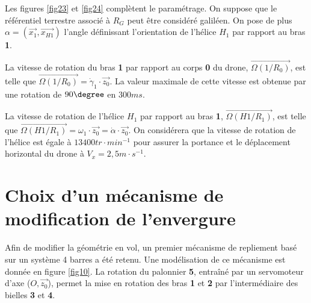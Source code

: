 Les figures \ref{fig23} et \ref{fig24} complètent le paramétrage. On suppose que le référentiel terrestre associé à $R_G$ peut être considéré galiléen. On pose de plus $\alpha=(\vec{x_1},\vec{x_{H1}})$ l'angle définissant l'orientation de l'hélice \textbf{$H_1$} par rapport au bras \textbf{1}.

La vitesse de rotation du bras \textbf{1} par rapport au corps \textbf{0} du drone, $\overrightarrow{\Omega(1/R_0)}$, est telle que $\overrightarrow{\Omega(1/R_0)}=\dot{\gamma}_1\cdot\vec{z_0}$. La valeur maximale de cette vitesse est obtenue par une rotation de $90\degree$ en
$300ms$.

La vitesse de rotation de l'hélice \textbf{$H_1$} par rapport au bras \textbf{1}, $\overrightarrow{\Omega(H1/R_1)}$, est telle que $\overrightarrow{\Omega(H1/R_1)}=\omega_1\cdot \vec{z_0}=\dot{\alpha}\cdot\vec{z_0}$. On considérera que la vitesse de rotation de l'hélice est égale à $13400tr\cdot min^{-1}$ pour assurer la portance et le déplacement horizontal du drone à $V_x=2,5m\cdot s^{-1}$.



\section{Choix d'un mécanisme de modification de l'envergure}

Afin de modifier la géométrie en vol, un premier mécanisme de repliement basé sur un système 4 barres a été retenu. Une modélisation de ce mécanisme est donnée en figure \ref{fig10}. La rotation du palonnier \textbf{5}, entraîné par un servomoteur d'axe ($O,\vec{z_0}$), permet la mise en rotation des bras \textbf{1} et \textbf{2} par l'intermédiaire des bielles \textbf{3} et \textbf{4}.


